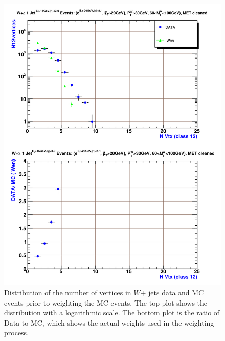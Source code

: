 \begin{figure}[p]
 \centering
 \includegraphics[scale=0.8,keepaspectratio=true]{./WJets_NvtxWgts.pdf}
 \caption{Distribution of the number of vertices in $W$+ jets data and MC events prior to weighting the MC events. The top plot shows the distribution with a logarithmic scale. The bottom plot is the ratio of Data to MC, which shows the actual weights used in the weighting process.}
\label{fig:WJets_NvtxWgts}
\end{figure}

